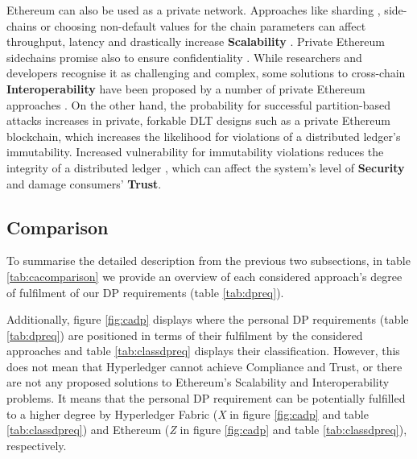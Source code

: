 Ethereum can also be used as a private network. Approaches like sharding \cite{sharding}, side-chains \cite{sidechains} or choosing non-default values for the chain parameters can affect throughput, latency and drastically increase \textbf{Scalability} \cite{schaffer_eth_scalability}. Private Ethereum sidechains promise also to ensure confidentiality \cite{eth_sidechains_interop}. While researchers and developers recognise it as challenging and complex, some solutions to cross-chain \textbf{Interoperability} have been proposed by a number of private Ethereum approaches \cite{plasma,polkadot,ion}. On the other hand, the probability for successful partition-based attacks \cite{confidentiality_vs_integrity} increases in private, forkable DLT designs such as a private Ethereum blockchain, which increases the likelihood for violations of a distributed ledger’s immutability. Increased vulnerability for immutability violations reduces the integrity of a distributed ledger \cite{dlt_4}, which can affect the system's level of \textbf{Security} and damage consumers' \textbf{Trust}.

\subsection{Comparison}
\label{ssec:ca-comparison}

To summarise the detailed description from the previous two subsections, in table \ref{tab:cacomparison} we provide an overview of each considered approach's degree of fulfilment of our DP requirements (table \ref{tab:dpreq}).

Additionally, figure \ref{fig:cadp} displays where the personal DP requirements (table \ref{tab:dpreq}) are positioned in terms of their fulfilment by the considered approaches and table \ref{tab:classdpreq} displays their classification. However, this does not mean that Hyperledger cannot achieve Compliance and Trust, or there are not any proposed solutions to Ethereum's Scalability and Interoperability problems. It means that the personal DP requirement can be potentially fulfilled to a higher degree by Hyperledger Fabric (\textit{X} in figure \ref{fig:cadp} and table \ref{tab:classdpreq}) and Ethereum (\textit{Z} in figure \ref{fig:cadp} and table \ref{tab:classdpreq}), respectively.

